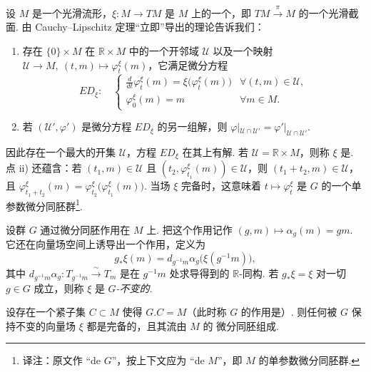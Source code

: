 \begin{numpara}[关于向量场的流的回顾]\label{np:lie-1-7-3}
设 $M$ 是一个光滑流形，$\xi:M\longrightarrow TM$ 是 $M$ 上的一个，即 $TM\xrightarrow{\ \pi\ }M$ 的一个光滑截面. 由 Cauchy--Lipschitz 定理``立即''导出的理论告诉我们：
\begin{enumerate}[label=\roman*)]
\item 存在 $\{0\}\times M$ 在 $\mathbb R\times M$ 中的一个开邻域 $\mathcal U$ 以及一个映射 $\mathcal U\longrightarrow M,\ (t,m)\mapsto\varphi^{\xi}_{t}(m)$，它满足微分方程
\[
ED_{\xi}:\quad
\begin{cases}
\frac{d}{dt}\varphi^{\xi}_{t}(m)=\xi\bigl(\varphi^{\xi}_{t}(m)\bigr) & \forall(t,m)\in\mathcal U,\\
\varphi^{\xi}_{0}(m)=m & \forall m\in M.
\end{cases}
\]
\item 若 $(\mathcal U',\varphi')$ 是微分方程 $ED_{\xi}$ 的另一组解，则 $\varphi|_{\mathcal U\cap\mathcal U'}=\varphi'|_{\mathcal U\cap\mathcal U'}$.
\end{enumerate}
因此存在一个最大的开集 $\mathcal U$，方程 $ED_{\xi}$ 在其上有解. 若 $\mathcal U=\mathbb R\times M$，则称 $\xi$ 是.
点 ii) 还蕴含：若 $(t_{1},m)\in\mathcal U$ 且 $(t_{2},\varphi^{\xi}_{t_{1}}(m))\in\mathcal U$，则 $(t_{1}+t_{2},m)\in\mathcal U$，且 $\varphi^{\xi}_{t_{1}+t_{2}}(m)=\varphi^{\xi}_{t_{2}}\bigl(\varphi^{\xi}_{t_{1}}(m)\bigr)$.
当场 $\xi$ 完备时，这意味着 $t\mapsto\varphi^{\xi}_{t}$ 是 $G$ 的一个单参数微分同胚群\footnote{译注：原文作 ``de $G$''，按上下文应为 ``de $M$''，即 $M$ 的单参数微分同胚群.}.
\end{numpara}

\begin{numpara}[群不变的向量场]\label{np:lie-1-7-4}
设群 $G$ 通过微分同胚作用在 $M$ 上. 把这个作用记作 $(g,m)\mapsto\alpha_{g}(m)=gm$. 它还在向量场空间上诱导出一个作用，定义为
\[
g_{*}\xi(m)=d_{g^{-1}m}\alpha_{g}\bigl(\xi(g^{-1}m)\bigr),
\]
其中 $d_{g^{-1}m}\alpha_{g}:T_{g^{-1}m}\xrightarrow{\ \sim\ }T_{m}$ 是在 $g^{-1}m$ 处求导得到的 $\mathbb R$-同构. 若 $g_{*}\xi=\xi$ 对一切 $g\in G$ 成立，则称 $\xi$ 是 \emph{$G$-不变的}.
\end{numpara}

\begin{lemma*}
设存在一个紧子集 $C\subset M$ 使得 $G.C=M$（此时称 $G$ 的作用是）. 则任何被 $G$ 保持不变的向量场 $\xi$ 都是完备的，且其流由 $M$ 的 微分同胚组成.
\end{lemma*}


